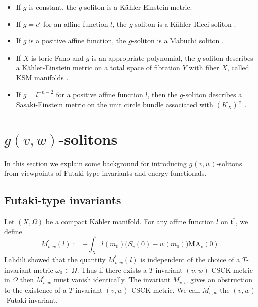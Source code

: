 \documentclass[12pt]{amsart}
\numberwithin{equation}{section}%
\theoremstyle{plain}
\theoremstyle{definition}
\newcommand{\MA}{\mathrm{MA}}
\newcommand{\1}{\mathbf{1}}
\begin{document}
\begin{itemize}
\item If $g$ is constant, the $g$-soliton is a K\"ahler-Einstein metric.
\item If $g=e^{l}$ for an affine function $l$,
the $g$-soliton is a K\"ahler-Ricci soliton \cite{TZ00}.
\item If $g$ is a positive affine function, the $g$-soliton
is a Mabuchi soliton \cite{Ma01}.
\item If $X$ is toric Fano and $g$ is an appropriate polynomial, the $g$-soliton
describes a K\"ahler-Einstein metric on a total space of fibration $Y$ with fiber $X$,
called KSM manifolds \cite{Nakg19, NN24}.
\item If $g=l^{-n-2}$ for a positive affine function $l$,
then the $g$-soliton describes a Sasaki-Einstein metric on
the unit circle bundle associated with $(K_{X})^{\times}$ \cite{AJL23}.
\end{itemize}
\section{$g(v,w)$-solitons}
In this section we explain some background for introducing $g(v,w)$-solitons
from viewpoints of Futaki-type invariants and energy functionals.

\subsection{Futaki-type invariants}
Let $(X, \Omega)$ be a compact K\"ahler manifold.
For any affine function $l$ on $\mathfrak{t}^{*}$, we define
\begin{equation}
M^{\prime}_{v,w}(l)
:=-\int_{X}l(m_0)\Big(S_{v}(0)-w(m_0)\Big)\MA_{v}(0).
\end{equation}
Lahdili \cite{Lah19} showed that
the quantity $M^{\prime}_{v,w}(l)$ is independent of the choice
of a $T$-invariant metric $\omega_{0}\in\Omega$.
Thus if there exists a $T$-invariant $(v,w)$-CSCK metric in $\Omega$
then $M^{\prime}_{v,w}$ must vanish identically.
The invariant $M^{\prime}_{v,w}$ gives an obstruction to the existence
of a $T$-invariant $(v,w)$-CSCK metric.
We call $M^{\prime}_{v,w}$ the $(v,w)$-Futaki invariant.
\end{document}
